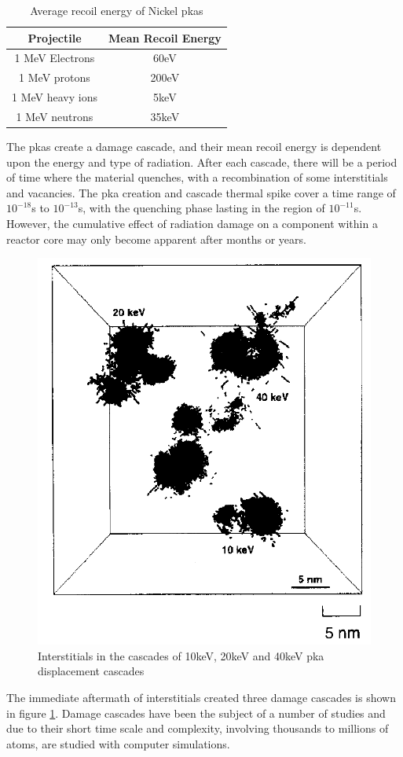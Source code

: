 \begin{table}[h]
\begin{center}
\renewcommand{\arraystretch}{1.2}
\begin{tabular}{c c}
\hline\hline
Projectile & Mean Recoil Energy \\
\hline\hline
1 MeV Electrons & 60eV \\
1 MeV protons & 200eV \\
1 MeV heavy ions & 5keV \\
1 MeV neutrons & 35keV \\
\hline\hline
\end{tabular}
\end{center}
\caption{Average recoil energy of Nickel \acrshort{pka}s\cite{gswas}}
\end{table}

The \acrshort{pka}s create a damage cascade, and their mean recoil energy is dependent upon the energy and type of radiation.  After each cascade, there will be a period of time where the material quenches, with a recombination of some interstitials and vacancies.  The \acrshort{pka} creation and cascade thermal spike cover a time range of $10^{-18}$s to $10^{-13}$s, with the quenching phase lasting in the region of $10^{-11}$s.  However, the cumulative effect of radiation damage on a component within a reactor core may only become apparent after months or years.

\begin{figure}
  \begin{center}
    \includegraphics[width=.4\linewidth]{chapters/consequences_of_ionizing_radiation/images/stoller1996damage.png}
    \caption{Interstitials in the cascades of 10keV, 20keV and 40keV \acrshort{pka} displacement cascades \cite{stollerdamage1996}}
    \label{fig:stollerdamage}
  \end{center}
\end{figure}

The immediate aftermath of interstitials created three damage cascades is shown in figure \ref{fig:stollerdamage}\cite{stollerdamage1996}.  Damage cascades have been the subject of a number of studies and due to their short time scale and complexity, involving thousands to millions of atoms, are studied with computer simulations.



